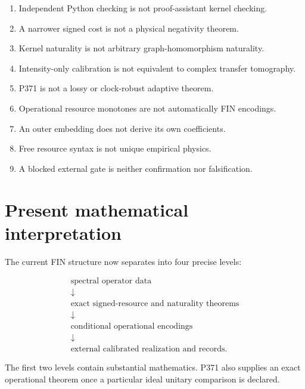 \documentclass[11pt,a4paper,openany]{report}
\begin{document}
\begin{enumerate}
\item 
Independent Python checking is not proof-assistant kernel checking.

\item 
A narrower signed cost is not a physical negativity theorem.

\item 
Kernel naturality is not arbitrary graph-homomorphism naturality.

\item 
Intensity-only calibration is not equivalent to complex transfer tomography.

\item 
P371 is not a lossy or clock-robust adaptive theorem.

\item 
Operational resource monotones are not automatically FIN encodings.

\item 
An outer embedding does not derive its own coefficients.

\item 
Free resource syntax is not unique empirical physics.

\item 
A blocked external gate is neither confirmation nor falsification.

\end{enumerate}

\chapter{Present mathematical interpretation}

The current FIN structure now separates into four precise levels:

\[
\begin{array}{c}
\text{spectral operator data}\\
\downarrow\\
\text{exact signed-resource and naturality theorems}\\
\downarrow\\
\text{conditional operational encodings}\\
\downarrow\\
\text{external calibrated realization and records}.
\end{array}
\]

The first two levels contain substantial mathematics. P371 also supplies an exact operational theorem once a particular ideal unitary comparison is declared.
\end{document}
